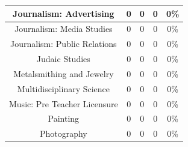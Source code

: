 \documentclass[10]{article}
\begin{document}
\begin{longtable}[c]{|ccccc|}
	\multicolumn{1}{|c|}{Journalism: Advertising}                    & \multicolumn{1}{c|}{0}                               & \multicolumn{1}{c|}{0}                                   & \multicolumn{1}{c|}{0}                  & 0\%                   \\ \hline
	\multicolumn{1}{|c|}{Journalism: Media Studies}                  & \multicolumn{1}{c|}{0}                               & \multicolumn{1}{c|}{0}                                   & \multicolumn{1}{c|}{0}                  & 0\%                   \\ \hline
	\multicolumn{1}{|c|}{Journalism: Public Relations}               & \multicolumn{1}{c|}{0}                               & \multicolumn{1}{c|}{0}                                   & \multicolumn{1}{c|}{0}                  & 0\%                   \\ \hline
	\multicolumn{1}{|c|}{Judaic Studies}                             & \multicolumn{1}{c|}{0}                               & \multicolumn{1}{c|}{0}                                   & \multicolumn{1}{c|}{0}                  & 0\%                   \\ \hline
	\multicolumn{1}{|c|}{Metalsmithing and Jewelry}                  & \multicolumn{1}{c|}{0}                               & \multicolumn{1}{c|}{0}                                   & \multicolumn{1}{c|}{0}                  & 0\%                   \\ \hline
	\multicolumn{1}{|c|}{Multidisciplinary Science}                  & \multicolumn{1}{c|}{0}                               & \multicolumn{1}{c|}{0}                                   & \multicolumn{1}{c|}{0}                  & 0\%                   \\ \hline
	\multicolumn{1}{|c|}{Music: Pre Teacher Licensure}               & \multicolumn{1}{c|}{0}                               & \multicolumn{1}{c|}{0}                                   & \multicolumn{1}{c|}{0}                  & 0\%                   \\ \hline
	\multicolumn{1}{|c|}{Painting}                                   & \multicolumn{1}{c|}{0}                               & \multicolumn{1}{c|}{0}                                   & \multicolumn{1}{c|}{0}                  & 0\%                   \\ \hline
	\multicolumn{1}{|c|}{Photography}                                & \multicolumn{1}{c|}{0}                               & \multicolumn{1}{c|}{0}                                   & \multicolumn{1}{c|}{0}                  & 0\%                   \\ \hline

\end{longtable}
\end{document}
